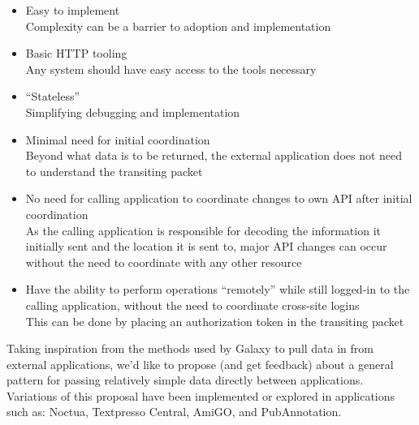\documentclass[10pt,oneside]{article}
\begin{document}
\begin{itemize}[noitemsep]
\item Easy to implement \\ Complexity can be a barrier to adoption and
  implementation
\item Basic HTTP tooling \\ Any system should have easy access to
  the tools necessary
\item ``Stateless'' \\ Simplifying debugging and implementation
\item Minimal need for initial coordination \\ Beyond what data is to
  be returned, the external application does not need to understand
  the transiting packet
\item No need for calling application to coordinate changes to own API
  after initial coordination \\ As the calling application is
  responsible for decoding the information it initially sent and the
  location it is sent to, major API changes can occur without the need
  to coordinate with any other resource
\item Have the ability to perform operations ``remotely'' while still
  logged-in to the calling application, without the need to coordinate
  cross-site logins \\ This can be done by placing an authorization
  token in the transiting packet
\end{itemize}

Taking inspiration from the methods used by Galaxy \citep{Galaxy} to
pull data in from external applications, we'd like to propose (and get
feedback) about a general pattern for passing relatively simple data
directly between applications. Variations of this proposal have been
implemented or explored in applications such as: Noctua, Textpresso
Central, AmiGO, and PubAnnotation.


\end{document}
